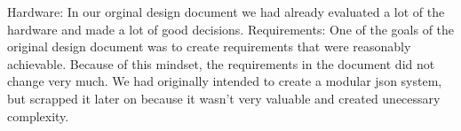 Hardware:
In our orginal design document we had already evaluated a lot of the hardware and made a lot of good decisions.
Requirements:
One of the goals of the original design document was to create requirements that were reasonably achievable. Because of this mindset, the requirements in the document did not change very much.
We had originally intended to create a modular json system, but scrapped it later on because it wasn't very valuable and created unecessary complexity.
